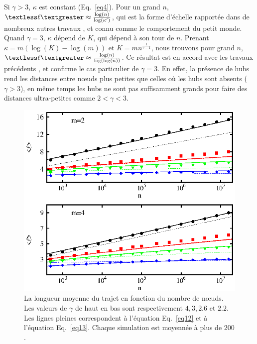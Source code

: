 Si $\gamma>3$, $\kappa$ est constant (Eq.~\eqref{eq4}). Pour un grand $n$, $\textless\ell\textgreater\approx\frac{\log(n)} {\log (\kappa')}$, qui est la forme d'échelle rapportée dans de nombreux autres travaux \cite{Bollobas1985,Chung-Lu2002,Fronczak-al2004,Hofstad-al2004,Cohen-Havlin2009}, et connu comme le comportement du petit monde. \\
Quand $\gamma=3$, $\kappa$ dépend de $K$, qui dépend à son tour de $n$. Prenant $\kappa=m(\log(K)-\log(m))$ et $K=mn^{\frac{1}{\gamma-1}}$, nous trouvons pour grand $n$, $\textless\ell\textgreater\approx \frac{\log(n)} {\log(\log(n))} $. Ce résultat est en accord avec les travaux précédents \cite {Chung-Lu2002,Cohen-Havlin2003,Fronczak-al2004,Bollobas-Riodan2002}, et confirme le cas particulier de $ \gamma = 3 $. En effet, la présence de hubs rend les distances entre nœuds plus petites que celles où les hubs sont absents ($\gamma>3$), en même temps les hubs ne sont pas suffisamment grands pour faire des distances ultra-petites comme $2<\gamma<3$.

\begin{figure}[h]
	\centering
	\includegraphics[scale=1.2]{./figures/fig4-3}
	\caption{La longueur moyenne du trajet en fonction du nombre de nœuds. Les valeurs de $\gamma$ de haut en bas sont respectivement $ 4, 3, 2.6 $ et $ 2.2 $. Les lignes pleines correspondent à l'équation Eq.~\eqref{eq12} et à l'équation Eq.~\eqref{eq13}. Chaque simulation est moyennée à plus de $200 $.}
	\label{fig4-3}
\end{figure}  
 

